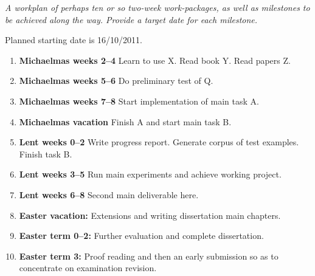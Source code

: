 \documentclass[12pt,a4paper,twoside]{article}
\begin{document}
\emph{A workplan of perhaps ten or so two-week work-packages,
as well as milestones to be achieved along the way. Provide a
target date for each milestone.}

Planned starting date is 16/10/2011.

\begin{enumerate}

\item \textbf{Michaelmas weeks 2--4} Learn to use X. Read book Y. Read papers Z.

\item \textbf{Michaelmas weeks 5--6} Do preliminary test of Q.

\item \textbf{Michaelmas weeks 7--8} Start implementation of main task A.

\item \textbf{Michaelmas vacation} Finish A and start main task B.

\item \textbf{Lent weeks 0--2} Write progress report. Generate corpus of
  test examples. Finish task B.

\item \textbf{Lent weeks 3--5} Run main experiments and achieve working project.

\item \textbf{Lent weeks 6--8} Second main deliverable here.

\item \textbf{Easter vacation:} Extensions and writing dissertation main
  chapters.

\item \textbf{Easter term 0--2:}  Further evaluation and complete dissertation.

\item \textbf{Easter term 3:} Proof reading and then an early submission
  so as to concentrate on examination revision.

\end{enumerate}

\printbibliography
\end{document}
